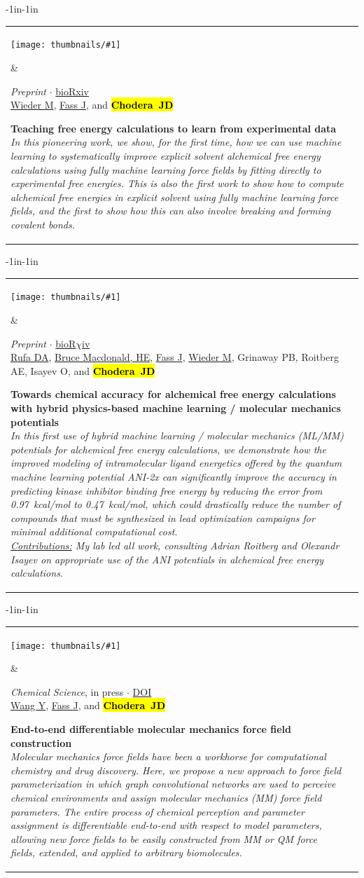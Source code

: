 \documentclass[10pt]{article}
\newcommand{\newarticle}[7]{
\begin{adjustwidth}{-1in}{-1in}  
\begin{tabular}{p{0.9in}p{7in}}
\parbox[c]{0.9in}{\texttt{[image: thumbnails/\#1]}} & \parbox[c]{6in}{\setstretch{0.9} {\small #4} $\cdot$ \href{#6}{#5} \\ {\footnotesize {#2}} \\ \raggedright { \bf\nohyphens{#3}}  \\ {\footnotesize\emph {#7}}} %
\end{tabular}
\end{adjustwidth}
\vspace{0.2in}
}
\newcommand{\jdc}{ {\bf \hl{Chodera~JD}} } %
\begin{document}
\newarticle{qml-explicit-free-energy}{\underline{Wieder M}, \underline{Fass J}, and \jdc}{Teaching free energy calculations to learn from experimental data}{\emph{Preprint}}{bioRxiv}{https://doi.org/10.1101/2021.08.24.457513}{In this pioneering work, we show, for the first time, how we can use machine learning to systematically improve explicit solvent alchemical free energy calculations using fully machine learning force fields by fitting directly to experimental free energies. This is also the first work to show how to compute alchemical free energies in explicit solvent using fully machine learning force fields, and the first to show how this can also involve breaking and forming covalent bonds.}

\newarticle{hybrid-qm-mm.jpg}{\underline{Rufa DA}, \underline{Bruce Macdonald, HE}, \underline{Fass J}, \underline{Wieder M}, Grinaway PB, Roitberg AE, Isayev O, and \jdc}{Towards chemical accuracy for alchemical free energy calculations with hybrid physics-based machine learning / molecular mechanics potentials}{\emph{Preprint}}{bioR$\chi$iv}{https://doi.org/10.1101/2020.07.29.227959}{In this first use of hybrid machine learning / molecular mechanics (ML/MM) potentials for alchemical free energy calculations, we demonstrate how the improved modeling of intramolecular ligand energetics offered by the quantum machine learning potential ANI-2x can significantly improve the accuracy in predicting kinase inhibitor binding free energy by reducing the error from 0.97~kcal/mol to 0.47~kcal/mol, which could drastically reduce the number of compounds that must be synthesized in lead optimization campaigns for minimal additional computational cost.\\
\underline{Contributions:} My lab led all work, consulting Adrian Roitberg and Olexandr Isayev on appropriate use of the ANI potentials in alchemical free energy calculations.
}

\newarticle{espaloma.jpg}{\underline{Wang Y}, \underline{Fass J}, and \jdc}{End-to-end differentiable molecular mechanics force field construction}{\emph{Chemical Science}, in press}{DOI}{https://doi.org/10.1039/D2SC02739A}{Molecular mechanics force fields have been a workhorse for computational chemistry and drug discovery. Here, we propose a new approach to force field parameterization in which graph convolutional networks are used to perceive chemical environments and assign molecular mechanics (MM) force field parameters. The entire process of chemical perception and parameter assignment is differentiable end-to-end with respect to model parameters, allowing new force fields to be easily constructed from MM or QM force fields, extended, and applied to arbitrary biomolecules.}
\end{document}
